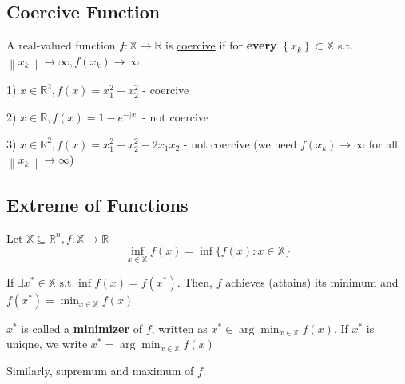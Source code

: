 \documentclass[11pt]{elegantbook}
\begin{document}
\subsection{Coercive Function}

\begin{definition}[Coercive]
    A real-valued function $f:\mathbb{X} \rightarrow \mathbb{R}$ is \underline{coercive} if for \textbf{every} $\left\{x_{k}\right\} \subset \mathbb{X}$ s.t. $\left\|x_{k}\right\| \rightarrow \infty, f\left(x_{k}\right) \rightarrow \infty$
\end{definition}

\begin{example}
\end{example}
1) $x \in \mathbb{R}^{2}, f(x)=x_{1}^{2}+x_{2}^{2}$ - coercive

2) $x \in \mathbb{R}, f(x)=1-e^{-|x|}$ - not coercive

3) $x \in \mathbb{R}^{2}, f(x)=x_{1}^{2}+x_{2}^{2}-2 x_{1} x_{2}$ - not coercive
(we need $f(x_k)\rightarrow	\infty$ for all $\left\|x_{k}\right\| \rightarrow \infty$)


\subsection{Extreme of Functions}
\begin{definition}
    Let $\mathbb{X} \subseteq \mathbb{R}^{n}, f: \mathbb{X} \rightarrow \mathbb{R}$
    $$\inf_{x \in \mathbb{X}} f(x)=\inf\{f(x): x \in \mathbb{X}\}$$
\end{definition}

If $\exists x^{*} \in \mathbb{X} \text { s.t. inf } f(x)=f\left(x^{*}\right)$. Then, $f$ achieves (attains) its minimum and $f\left(x^{*}\right)=\min _{x \in \mathbb{X}} f(x)$

$x^{*}$ is called a \textbf{minimizer} of $f$, written as $x^{*} \in \arg \min _{x \in \mathbb{X}} f(x)$. If $x^*$ is uniqne, we write $x^{*}=\arg \min _{x \in \mathbb{X}} f(x)
$

Similarly, supremum and maximum of $f$.
\end{document}

